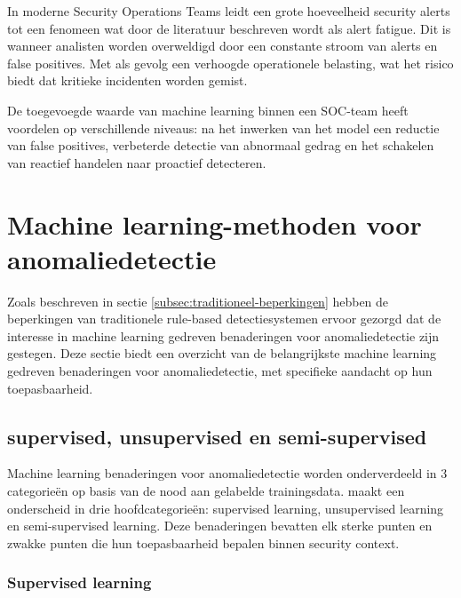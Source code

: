 In moderne Security Operations Teams leidt een grote hoeveelheid security alerts tot een fenomeen wat door de literatuur beschreven wordt als alert fatigue. Dit is wanneer analisten worden overweldigd door een constante stroom van alerts en false positives. Met als gevolg een verhoogde operationele belasting, wat het risico biedt dat kritieke incidenten worden gemist. 

De toegevoegde waarde van machine learning binnen een SOC-team heeft voordelen op verschillende niveaus: na het inwerken van het model een reductie van false positives, verbeterde detectie van abnormaal gedrag en het schakelen van reactief handelen naar proactief detecteren\textcite{Miranda2025}. %


\section{Machine learning-methoden voor anomaliedetectie}
\label{sec:ML-methoden-anomalie}

Zoals beschreven in sectie \ref{subsec:traditioneel-beperkingen} hebben de beperkingen van traditionele rule-based detectiesystemen ervoor gezorgd dat de interesse in machine learning gedreven benaderingen voor anomaliedetectie zijn gestegen. Deze sectie biedt een overzicht van de belangrijkste machine learning gedreven benaderingen voor anomaliedetectie, met specifieke aandacht op hun toepasbaarheid. 

\subsection{supervised, unsupervised en semi-supervised}
\label{subsec:toegevoegde-waarde-ML}

Machine learning benaderingen voor anomaliedetectie worden onderverdeeld in 3 categorieën op basis van de nood aan gelabelde trainingsdata. \textcite{Saabith2023} maakt een onderscheid in drie hoofdcategorieën: supervised learning, unsupervised learning en semi-supervised learning. Deze benaderingen bevatten elk sterke punten en zwakke punten die hun toepasbaarheid bepalen binnen security context.


\subsubsection{Supervised learning}

